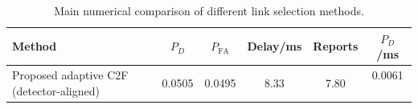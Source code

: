\begin{table}[t]
    \centering
    \caption{Main numerical comparison of different link selection methods.}
    \label{tab:main_summary}
    \begin{tabular}{l c c c c c}
        \hline
        Method & $P_D$ & $P_{\mathrm{FA}}$ & Delay/ms & Reports & $P_D$/ms \\
        \hline
        Proposed adaptive C2F (detector-aligned) & 0.0505 & 0.0495 & 8.33 & 7.80 & 0.0061 \
        \hline
    \end{tabular}
\end{table}

